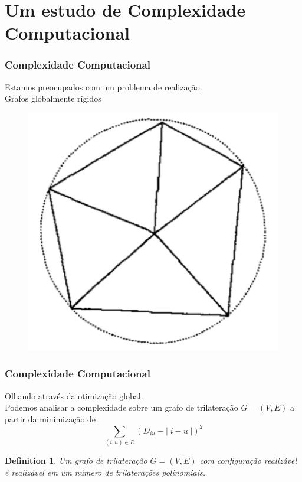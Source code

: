 \documentclass{beamer}
\newtheorem{definicao}{Definition}
\begin{document}
\section{Um estudo de Complexidade Computacional}
\begin{frame}
\frametitle{\normalsize Complexidade Computacional}
\begin{flushleft}
Estamos preocupados com um problema de realização.
\vspace{0.1cm}
\\\hspace{0.7cm} Grafos globalmente rígidos
\end{flushleft}
\begin{figure} 
	\includegraphics[scale=0.35]{ggr}
\end{figure}
\end{frame}

\begin{frame}
\frametitle{\normalsize Complexidade Computacional}
\begin{flushleft}
	Olhando através da otimização global.
	\vspace{0.1cm}
	\\\hspace{0.7cm} Podemos analisar a complexidade sobre um grafo de trilateração $G = (V,E)$ a partir da minimização de 
	$$ \sum_{(i,u) \in E} (D_{iu} - ||i - u||)^2 $$
\end{flushleft}
\begin{definicao}
	Um grafo de trilateração $G = (V,E)$ com configuração realizável é realizável em um número de trilaterações polinomiais.
\end{definicao}
\end{frame}
\end{document}
